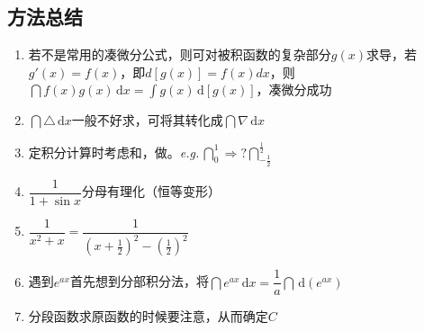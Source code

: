 \documentclass[../book.tex]{subfiles}
\begin{document}
    \subsection{方法总结}

    \begin{enumerate}
        \item 若不是常用的凑微分公式，则可对被积函数的复杂部分$g(x)$求导，若$g'(x) = f(x)$，即$d[g(x)] = f(x)dx$，则$\dint f(x)g(x)\,\mathrm{d}x = \int g(x)\,\mathrm{d}[g(x)]$，凑微分成功
        \item $\dint \triangle\,\mathrm{d}x$一般不好求，可将其转化成$\dint \nabla\,\mathrm{d}x$
        \item 定积分计算时考虑{\color{customgreen}{奇偶性}}和{\color{customgreen}{周期性}}，做{\color{customgreen}{平移代换}}。\emph{e.g.}\,$\dint_0^1 \Rightarrow? \dint_{-\frac{1}{2}}^{\frac{1}{2}}$
        \item $\dfrac{1}{1+\sin x}$分母有理化（恒等变形）
        \item $\dfrac{1}{x^2 + x} = \dfrac{1}{(x+\frac{1}{2})^2 - (\frac{1}{2})^2}$
        \item 遇到$e^{ax}$首先想到分部积分法，将$\dint e^{ax}\,\mathrm{d}x = \dfrac{1}{a} \dint \,\mathrm{d}(e^{ax}) $
        \item 分段函数求原函数的时候要注意{\color{red}{连续性}}，从而确定$C$
    \end{enumerate}
\end{document}
